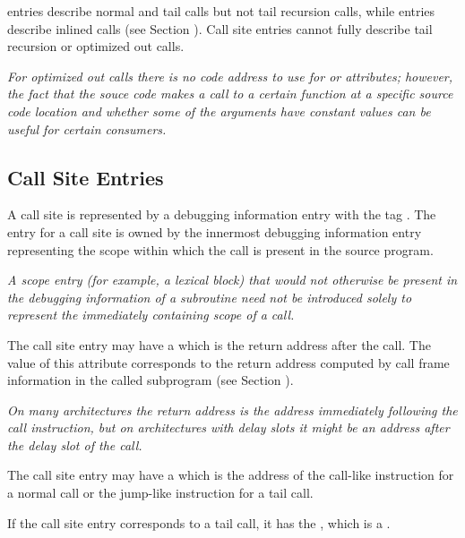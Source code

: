 \DWTAGcallsite{} entries describe normal and tail calls but not tail recursion calls,
while \DWTAGinlinedsubroutine{} entries describe inlined calls 
(see Section ).
Call site entries cannot 
\bb
fully
\eb
describe tail recursion or optimized out calls.

\bb
\textit{For optimized out calls there is no code address to use for
\DWATcallreturnpc{} or \DWATcallpc{} attributes; however, the fact
that the souce code makes a call to a certain function 
at a specific source code location and whether
some of the arguments have constant values can be useful for certain
consumers.}
\eb

\subsection{Call Site Entries}
\label{chap:callsiteentries}
A call site is represented by a debugging information entry with the tag
\DWTAGcallsiteTARG{}. 
The entry for a call site is owned by the innermost
debugging information entry representing the scope within which the
call is present in the source program.

\textit{A scope entry (for example, a lexical block) that would not 
otherwise be present in the debugging information of a subroutine
need not be introduced solely to represent the immediately containing scope
of a call.}

The call site entry may have a
\DWATcallreturnpcDEFN{}
which is the return address after the call.  
The value of this attribute corresponds to the return address 
computed by call frame information in the called subprogram 
(see Section ).

\textit{On many architectures the return address is the 
address immediately following the call instruction, but 
on architectures with delay slots it might
be an address after the delay slot of the call.}

The call site entry may have a 
\DWATcallpcDEFN{}
which is the address of the 
call-like instruction for a normal call or the jump-like 
instruction for a tail call.

If the call site entry corresponds to a tail call, it has the 
\DWATcalltailcallDEFN{}
,
which is a \CLASSflag.

